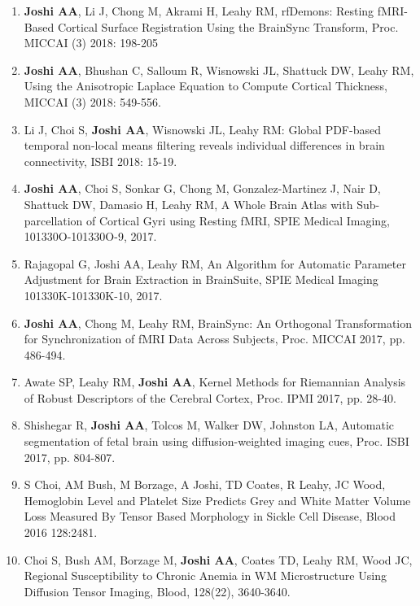 \documentclass[overlapped,line,letterpaper]{res}
\begin{document}
\begin{resume}
\begin{enumerate}
    \item \textbf{Joshi AA}, Li J, Chong M, Akrami H, Leahy RM, {rfDemons: Resting fMRI-Based Cortical Surface Registration Using the BrainSync Transform}, Proc. MICCAI (3) 2018: 198-205

    \item \textbf{Joshi AA}, Bhushan C, Salloum R, Wisnowski JL, Shattuck DW, Leahy RM, {Using the Anisotropic Laplace Equation to Compute Cortical Thickness}, MICCAI (3) 2018: 549-556. 

    \item Li J, Choi S, \textbf{Joshi AA}, Wisnowski JL, Leahy RM: {Global PDF-based temporal non-local means filtering reveals individual differences in brain connectivity},  ISBI 2018: 15-19.

    \item \textbf{Joshi AA}, Choi S, Sonkar G, Chong M,  Gonzalez-Martinez J, Nair D, Shattuck DW,  Damasio H, Leahy RM, {A Whole Brain Atlas with Sub-parcellation of Cortical Gyri using Resting fMRI}, SPIE Medical Imaging, 101330O-101330O-9, 2017.

    \item Rajagopal G, Joshi AA, Leahy RM, {An Algorithm for Automatic Parameter Adjustment for Brain Extraction in BrainSuite},  SPIE Medical Imaging 101330K-101330K-10, 2017.

    \item \textbf{Joshi AA}, Chong M, Leahy RM, {BrainSync: An Orthogonal Transformation for Synchronization of fMRI Data Across Subjects}, Proc. MICCAI 2017, pp. 486-494.

    \item Awate SP, Leahy RM, \textbf{Joshi AA}, {Kernel Methods for Riemannian Analysis of Robust Descriptors of the Cerebral Cortex}, Proc. IPMI 2017, pp. 28-40.

    \item Shishegar R, \textbf{Joshi AA}, Tolcos M,  Walker DW, Johnston LA, Automatic segmentation of fetal brain using diffusion-weighted imaging cues, Proc. ISBI 2017, pp. 804-807.

    \item S Choi, AM Bush, M Borzage, A Joshi, TD Coates, R Leahy, JC Wood, {Hemoglobin Level and Platelet Size Predicts Grey and White Matter Volume Loss Measured By Tensor Based Morphology in Sickle Cell Disease}, Blood 2016 128:2481.

    \item Choi S, Bush AM, Borzage M, \textbf{Joshi AA}, Coates TD, Leahy RM, Wood JC, {Regional Susceptibility to Chronic Anemia in WM Microstructure Using Diffusion Tensor Imaging}, Blood, 128(22), 3640-3640. 


\end{enumerate}
\end{resume}
\end{document}
